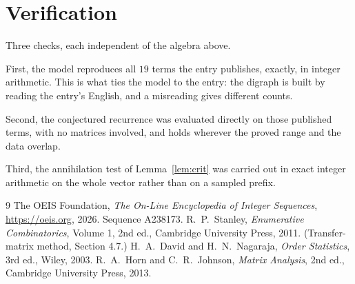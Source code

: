 \documentclass[11pt,a4paper]{article}
\theoremstyle{plain}
\theoremstyle{definition}
\begin{document}
\section{Verification}

Three checks, each independent of the algebra above.

First, the model reproduces all $19$ terms the entry publishes, exactly, in integer
arithmetic. This is what ties the model to the entry: the digraph is built by reading the
entry's English, and a misreading gives different counts.

Second, the conjectured recurrence was evaluated directly on those published terms, with no
matrices involved, and holds wherever the proved range and the data overlap.

Third, the annihilation test of Lemma~\ref{lem:crit} was carried out in exact integer
arithmetic on the whole vector rather than on a sampled prefix.

\begin{thebibliography}{9}
 The OEIS Foundation, \emph{The On-Line Encyclopedia of Integer
Sequences}, \url{https://oeis.org}, 2026. Sequence A238173.
 R.~P.~Stanley, \emph{Enumerative Combinatorics}, Volume 1, 2nd ed.,
Cambridge University Press, 2011. (Transfer-matrix method, Section 4.7.)
 H.~A.~David and H.~N.~Nagaraja, \emph{Order Statistics}, 3rd ed., Wiley,
2003.
 R.~A.~Horn and C.~R.~Johnson, \emph{Matrix Analysis}, 2nd ed., Cambridge
University Press, 2013.
\end{thebibliography}
\end{document}
